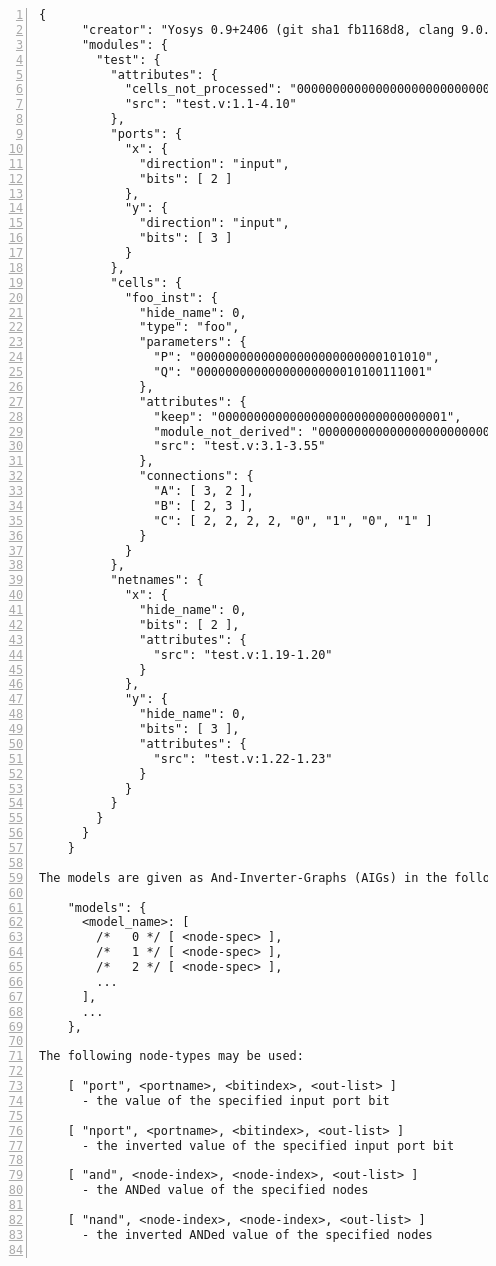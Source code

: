 \begin{lstlisting}[numbers=left,frame=single]
    {
      "creator": "Yosys 0.9+2406 (git sha1 fb1168d8, clang 9.0.1 -fPIC -Os)",
      "modules": {
        "test": {
          "attributes": {
            "cells_not_processed": "00000000000000000000000000000001",
            "src": "test.v:1.1-4.10"
          },
          "ports": {
            "x": {
              "direction": "input",
              "bits": [ 2 ]
            },
            "y": {
              "direction": "input",
              "bits": [ 3 ]
            }
          },
          "cells": {
            "foo_inst": {
              "hide_name": 0,
              "type": "foo",
              "parameters": {
                "P": "00000000000000000000000000101010",
                "Q": "00000000000000000000010100111001"
              },
              "attributes": {
                "keep": "00000000000000000000000000000001",
                "module_not_derived": "00000000000000000000000000000001",
                "src": "test.v:3.1-3.55"
              },
              "connections": {
                "A": [ 3, 2 ],
                "B": [ 2, 3 ],
                "C": [ 2, 2, 2, 2, "0", "1", "0", "1" ]
              }
            }
          },
          "netnames": {
            "x": {
              "hide_name": 0,
              "bits": [ 2 ],
              "attributes": {
                "src": "test.v:1.19-1.20"
              }
            },
            "y": {
              "hide_name": 0,
              "bits": [ 3 ],
              "attributes": {
                "src": "test.v:1.22-1.23"
              }
            }
          }
        }
      }
    }

The models are given as And-Inverter-Graphs (AIGs) in the following form:

    "models": {
      <model_name>: [
        /*   0 */ [ <node-spec> ],
        /*   1 */ [ <node-spec> ],
        /*   2 */ [ <node-spec> ],
        ...
      ],
      ...
    },

The following node-types may be used:

    [ "port", <portname>, <bitindex>, <out-list> ]
      - the value of the specified input port bit

    [ "nport", <portname>, <bitindex>, <out-list> ]
      - the inverted value of the specified input port bit

    [ "and", <node-index>, <node-index>, <out-list> ]
      - the ANDed value of the specified nodes

    [ "nand", <node-index>, <node-index>, <out-list> ]
      - the inverted ANDed value of the specified nodes


\end{lstlisting}
